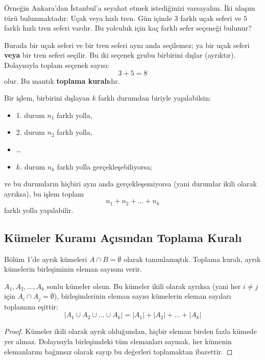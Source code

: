Örneğin Ankara'dan İstanbul'a seyahat etmek istediğinizi varsayalım. İki ulaşım türü bulunmaktadır: Uçak veya hızlı tren. Gün içinde $3$ farklı uçak seferi ve $5$ farklı hızlı tren seferi vardır. Bu yolculuk için kaç farklı sefer seçeneği bulunur?

Burada bir uçak seferi ve bir tren seferi aynı anda seçilemez; ya bir uçak seferi \textbf{veya} bir tren seferi seçilir. Bu iki seçenek grubu birbirini dışlar (ayrıktır). Dolayısıyla toplam seçenek sayısı:
\[ 3 + 5 = 8 \]
olur. Bu mantık \textbf{toplama kuralı}dır.

\begin{definition}
Bir işlem, birbirini dışlayan $k$ farklı durumdan biriyle yapılabilsin:
\begin{itemize}
  \item 1. durum $n_1$ farklı yolla,
  \item 2. durum $n_2$ farklı yolla,
  \item \dots
  \item $k$. durum $n_k$ farklı yolla gerçekleşebiliyorsa;
\end{itemize}
ve bu durumların hiçbiri aynı anda gerçekleşemiyorsa (yani durumlar ikili olarak ayrıksa), bu işlem toplam
\[ n_1 + n_2 + \dots + n_k \]
farklı yolla yapılabilir.
\end{definition}

\subsection{Kümeler Kuramı Açısından Toplama Kuralı}

Bölüm 1'de ayrık kümeleri $A \cap B = \emptyset$ olarak tanımlamıştık. Toplama kuralı, ayrık kümelerin birleşiminin eleman sayısını verir.

\begin{theorem}
$A_1, A_2, \dots, A_k$ sonlu kümeler olsun. Bu kümeler ikili olarak ayrıksa (yani her $i \neq j$ için $A_i \cap A_j = \emptyset$), birleşimlerinin eleman sayısı kümelerin eleman sayıları toplamına eşittir:
\[ |A_1 \cup A_2 \cup \dots \cup A_k| = |A_1| + |A_2| + \dots + |A_k| \]
\end{theorem}
\begin{proof}
Kümeler ikili olarak ayrık olduğundan, hiçbir eleman birden fazla kümede yer almaz. Dolayısıyla birleşimdeki tüm elemanları saymak, her kümenin elemanlarını bağımsız olarak sayıp bu değerleri toplamaktan ibarettir.
\end{proof}

